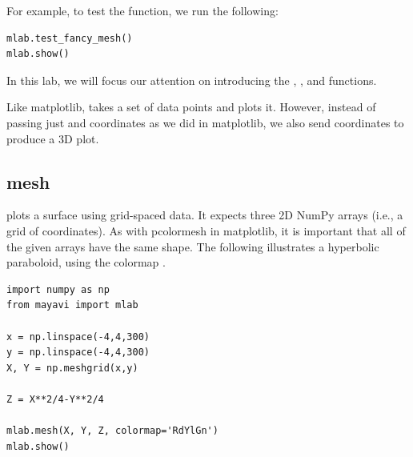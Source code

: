 For example, to test the  function, we run the following:
\begin{lstlisting}
mlab.test_fancy_mesh()
mlab.show()
\end{lstlisting}

In this lab, we will focus our attention on introducing the , , and  functions.

Like matplotlib,  takes a set of data points and plots it.
However, instead of passing just  and  coordinates as we did in matplotlib, we also send  coordinates to produce a 3D plot.

\subsection*{mesh}
 plots a surface using grid-spaced data.
It expects three 2D NumPy arrays (i.e., a grid of  coordinates).
As with pcolormesh in matplotlib, it is important that all of the given arrays have the same shape.
The following illustrates a hyperbolic paraboloid, using the colormap .
\begin{lstlisting}
import numpy as np
from mayavi import mlab

x = np.linspace(-4,4,300)
y = np.linspace(-4,4,300)
X, Y = np.meshgrid(x,y)

Z = X**2/4-Y**2/4

mlab.mesh(X, Y, Z, colormap='RdYlGn')
mlab.show()
\end{lstlisting}

